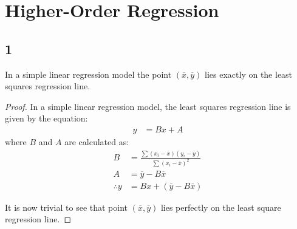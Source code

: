 \section{Higher-Order Regression}

\subsection{1}
\begin{claim}
    In a simple linear regression model the point \((\overline{x},\overline{y})\) lies exactly on the least squares regression line.
\end{claim}
\begin{proof}
In a simple linear regression model, the least squares regression line is given by the equation:
\begin{align*}
    y &= Bx + A
\end{align*}
where \(B\) and \(A\) are calculated as:
\begin{align}
    B&=\frac{\sum(x_i-\overline{x})(y_i-\overline{y})}{\sum(x_i - \overline{x})^2}\\
    A&= \overline{y} - B\overline{x}\\
    \therefore y &= Bx + ( \overline{y} - B\overline{x} )
\end{align}

It is now trivial to see that point \((\overline{x},\overline{y})\) lies perfectly on the least square regression line.
\end{proof}

